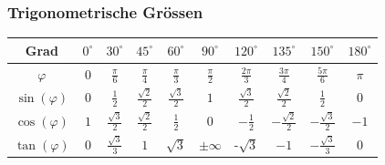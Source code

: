 \documentclass[8pt, a4paper, landscape, fleqn]{scrartcl}
\begin{document}
\begin{multicols*}{3}
				\subsubsection{Trigonometrische Grössen}
					\begin{tabular}{|c|c|c|c|c|c|c|c|c|c|}
						\hline
						Grad &$0^\circ$ &$30^\circ$ &$45^\circ$ &$60^\circ$ &$90^\circ$ &$120^\circ$ &$135^\circ$ &$150^\circ$ &$180^\circ$\\
						\hline
						$\varphi$ &$0$ &$\frac{\pi}{6}$ &$\frac{\pi}{4}$ &$\frac{\pi}{3}$ &$\frac{\pi}{2}$ &$\frac{2\pi}{3}$ &$\frac{3\pi}{4}$ &$\frac{5\pi}{6}$ &$\pi$\\
						\hline
						$\sin(\varphi)$ &$0$ &$\frac{1}{2}$ &$\frac{\sqrt{2}}{2}$ &$\frac{\sqrt{3}}{2}$ &$1$ &$\frac{\sqrt{3}}{2}$ &$\frac{\sqrt{2}}{2}$ &$\frac{1}{2}$ &$0$\\
						\hline
						$\cos(\varphi)$ &$1$ &$\frac{\sqrt{3}}{2}$ &$\frac{\sqrt{2}}{2}$ &$\frac{1}{2}$ &$0$ &$-\frac{1}{2}$ &$-\frac{\sqrt{2}}{2}$ &$-\frac{\sqrt{3}}{2}$ &$-1$\\
						\hline
						$\tan(\varphi)$ &$0$ &$\frac{\sqrt{3}}{3}$ &$1$ &$\sqrt{3}$ &$\pm \infty$ &-$\sqrt{3}$ &$-1$ &$-\frac{\sqrt{3}}{3}$ &$0$\\
						\hline 
					\end{tabular}
					\renewcommand{\arraystretch}{1.0}

\end{multicols*}
\end{document}

